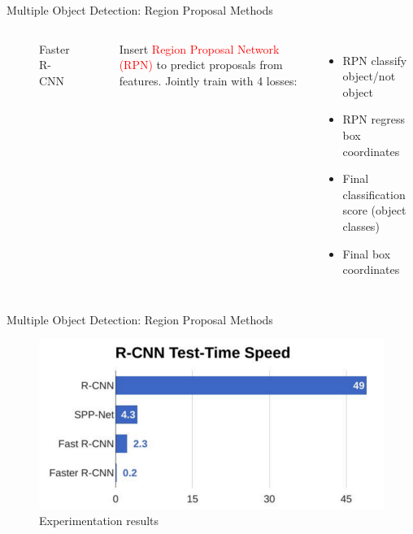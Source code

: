 \documentclass[aspectratio=169]{beamer}
\begin{document}
\begin{frame}{Multiple Object Detection: Region Proposal Methods}
\begin{columns}[T,c,onlytextwidth]
\begin{figure}
\caption{Faster R-CNN}
\end{figure}
Insert \textcolor{red}{Region Proposal Network (RPN)} to predict proposals from features. Jointly train with 4 losses:
\begin{itemize}
    \item RPN classify object/not object
    \item RPN regress box coordinates
    \item Final classification score (object classes)
    \item Final box coordinates
\end{itemize}
  \end{columns}
  
\end{frame}

\begin{frame}{Multiple Object Detection: Region Proposal Methods}
\begin{figure}
    \centering
    \includegraphics[scale=.3]{demo/figs/ex.png}
    \caption{Experimentation results}
\end{figure}
\end{frame}
\end{document}
